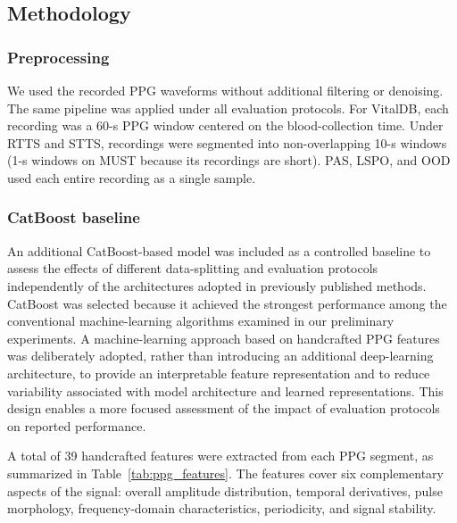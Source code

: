 \documentclass{article}
\begin{document}
\subsection{Methodology}

\subsubsection{Preprocessing}
We used the recorded PPG waveforms without additional filtering or denoising. The same pipeline was applied under all evaluation protocols. For VitalDB, each recording was a 60-s PPG window centered on the blood-collection time. Under RTTS and STTS, recordings were segmented into non-overlapping 10-s windows (1-s windows on MUST because its recordings are short). PAS, LSPO, and OOD used each entire recording as a single sample.


\subsubsection{CatBoost baseline}
An additional CatBoost-based model was included as a controlled baseline to assess the effects of different data-splitting and evaluation protocols independently of the architectures adopted in previously published methods. CatBoost was selected because it achieved the strongest performance among the conventional machine-learning algorithms examined in our preliminary experiments. A machine-learning approach based on handcrafted PPG features was deliberately adopted, rather than introducing an additional deep-learning architecture, to provide an interpretable feature representation and to reduce variability associated with model architecture and learned representations. This design enables a more focused assessment of the impact of evaluation protocols on reported performance.

A total of 39 handcrafted features were extracted from each PPG segment, as summarized in Table~\ref{tab:ppg_features}. The features cover six complementary aspects of the signal: overall amplitude distribution, temporal derivatives, pulse morphology, frequency-domain characteristics, periodicity, and signal stability.
\end{document}
